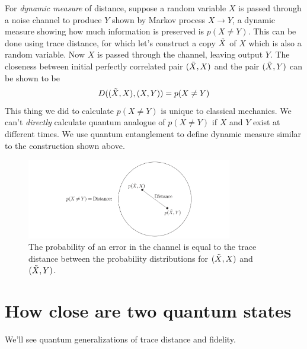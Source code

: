 For \textit{dynamic measure} of distance, suppose a random variable $X$ is passed through a noise channel to produce $Y$ shown by Markov process $X\longrightarrow Y$, a dynamic measure showing how much information is preserved is $p(X\neq Y)$. This can be done using trace distance, for which let's construct a copy $\Tilde{X}$ of $X$ which is also a random variable. Now $X$ is passed through the channel, leaving output $Y$. The closeness between initial perfectly correlated pair $(\Tilde{X}, X)$ and the pair $(\Tilde{X}, Y)$ can be shown to be
\begin{equation}
    D((\Tilde{X},X), (X, Y)) = p(X\neq Y)
    \label{eq:trace_distance_using_copy}
\end{equation}
This thing we did to calculate $p(X\neq Y)$ is unique to classical mechanics. We can't \textit{directly} calculate quantum analogue of $p(X\neq Y)$ if $X$ and $Y$ exist at different times. We use quantum entanglement to define dynamic measure similar to the construction shown above. 
\begin{figure}[H]
    \centering
    \includegraphics[width=0.8\textwidth]{images/dynamic_measure.png}
    \caption{The probability of an error in the channel is equal to the trace distance between the probability distributions for $( \Tilde{X}, X)$ and $( \Tilde{X}, Y )$.}
    \label{fig:dynamic_measure}
\end{figure}

\section{How close are two quantum states}
We'll see quantum generalizations of trace distance and fidelity.
